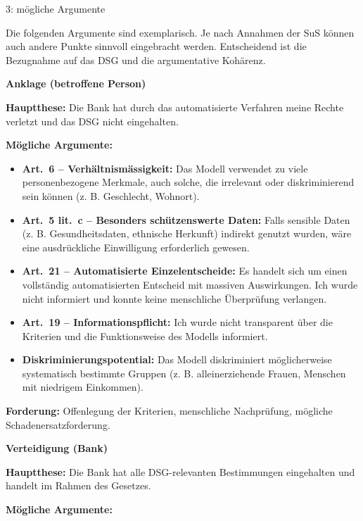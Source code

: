 \begin{aufgabe}{3: mögliche Argumente}

Die folgenden Argumente sind exemplarisch. Je nach Annahmen der SuS können auch andere Punkte sinnvoll eingebracht werden. Entscheidend ist die Bezugnahme auf das DSG und die argumentative Kohärenz.

\vspace{0.5em}
\textbf{Anklage (betroffene Person)}

\textbf{Hauptthese:} Die Bank hat durch das automatisierte Verfahren meine Rechte verletzt und das DSG nicht eingehalten.

\vspace{0.5em}
\textbf{Mögliche Argumente:}

\begin{itemize}
  \item \textbf{Art.\ 6 – Verhältnismässigkeit:} Das Modell verwendet zu viele personenbezogene Merkmale, auch solche, die irrelevant oder diskriminierend sein können (z. B. Geschlecht, Wohnort).
  \item \textbf{Art.\ 5 lit.\ c – Besonders schützenswerte Daten:} Falls sensible Daten (z. B. Gesundheitsdaten, ethnische Herkunft) indirekt genutzt wurden, wäre eine ausdrückliche Einwilligung erforderlich gewesen.
  \item \textbf{Art.\ 21 – Automatisierte Einzelentscheide:} Es handelt sich um einen vollständig automatisierten Entscheid mit massiven Auswirkungen. Ich wurde nicht informiert und konnte keine menschliche Überprüfung verlangen.
  \item \textbf{Art.\ 19 – Informationspflicht:} Ich wurde nicht transparent über die Kriterien und die Funktionsweise des Modells informiert.
  \item \textbf{Diskriminierungspotential:} Das Modell diskriminiert möglicherweise systematisch bestimmte Gruppen (z. B. alleinerziehende Frauen, Menschen mit niedrigem Einkommen).
\end{itemize}

\textbf{Forderung:} Offenlegung der Kriterien, menschliche Nachprüfung, mögliche Schadenersatzforderung.

\vspace{1em}
\textbf{Verteidigung (Bank)}

\textbf{Hauptthese:} Die Bank hat alle DSG-relevanten Bestimmungen eingehalten und handelt im Rahmen des Gesetzes.

\vspace{0.5em}
\textbf{Mögliche Argumente:}


\end{aufgabe}
